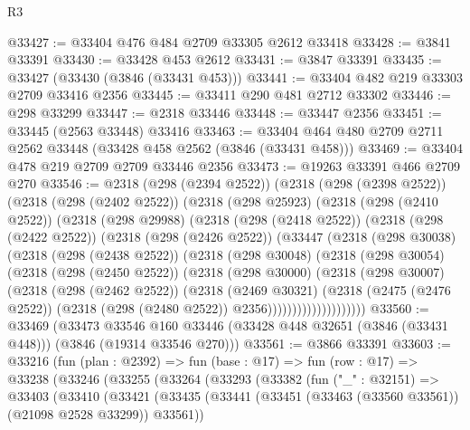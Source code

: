 \begin{lexlean}{R3}
\begin{coremodule}
@33427 := @33404 @476 @484 @2709 @33305 @2612 @33418
@33428 := @3841 @33391
@33430 := @33428 @453 @2612
@33431 := @3847 @33391
@33435 := @33427 (@33430 (@3846 (@33431 @453)))
@33441 := @33404 @482 @219 @33303 @2709 @33416 @2356
@33445 := @33411 @290 @481 @2712 @33302
@33446 := @298 @33299
@33447 := @2318 @33446
@33448 := @33447 @2356
@33451 := @33445 (@2563 @33448) @33416
@33463 := @33404 @464 @480 @2709 @2711 @2562 @33448 (@33428 @458 @2562 (@3846 (@33431 @458)))
@33469 := @33404 @478 @219 @2709 @2709 @33446 @2356
@33473 := @19263 @33391 @466 @2709 @270
@33546 := @2318
    (@298 (@2394 @2522))
    (@2318
      (@298 (@2398 @2522))
      (@2318
        (@298 (@2402 @2522))
        (@2318
          (@298 @25923)
          (@2318
            (@298 (@2410 @2522))
            (@2318
              (@298 @29988)
              (@2318
                (@298 (@2418 @2522))
                (@2318
                  (@298 (@2422 @2522))
                  (@2318
                    (@298 (@2426 @2522))
                    (@33447
                      (@2318
                        (@298 @30038)
                        (@2318
                          (@298 (@2438 @2522))
                          (@2318
                            (@298 @30048)
                            (@2318
                              (@298 @30054)
                              (@2318
                                (@298 (@2450 @2522))
                                (@2318
                                  (@298 @30000)
                                  (@2318
                                    (@298 @30007)
                                    (@2318
                                      (@298 (@2462 @2522))
                                      (@2318
                                        (@2469 @30321)
                                        (@2318
                                          (@2475 (@2476 @2522))
                                          (@2318 (@298 (@2480 @2522)) @2356))))))))))))))))))))
@33560 := @33469
    (@33473
      @33546
      @160
      @33446
      (@33428 @448 @32651 (@3846 (@33431 @448)))
      (@3846 (@19314 @33546 @270)))
@33561 := @3866 @33391
@33603 := @33216
    (fun (plan : @2392) =>
    fun (base : @17) =>
    fun (row : @17) =>
    @33238
      (@33246
        (@33255
          (@33264
            (@33293
              (@33382
                (fun ("_" : @32151) =>
                @33403
                  (@33410
                    (@33421
                      (@33435
                        (@33441 (@33451 (@33463 (@33560 @33561)) (@21098 @2528 @33299)) @33561))

\end{coremodule}
\end{lexlean}
